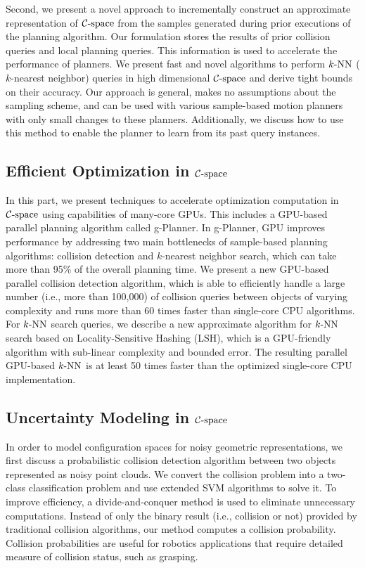 Second, we present a novel approach to incrementally construct an approximate representation of $\mathcal C\text{-space}$ from the samples generated during prior executions of the planning algorithm. Our formulation stores the results of prior collision queries and local planning queries. This information is used to accelerate the performance of planners. We present fast and novel algorithms to perform $k\text{-NN}$ ($k$-nearest neighbor) queries in high dimensional $\mathcal C\text{-space}$ and derive tight bounds on their accuracy. Our approach is general, makes no assumptions about the sampling scheme, and can be used with various sample-based motion planners with only small changes to these planners. Additionally, we discuss how to use this method to enable the planner to learn from its past query instances.

\subsection{Efficient Optimization in $\mathcal C\text{-space}$}
In this part, we present techniques to accelerate optimization computation in $\mathcal C\text{-space}$ using capabilities of many-core GPUs. This includes a GPU-based parallel planning algorithm called g-Planner. In g-Planner, GPU improves performance by addressing two main bottlenecks of sample-based planning algorithms: collision detection and $k$-nearest neighbor search, which can take more than 95\% of the overall planning time. We present a new GPU-based parallel collision detection
algorithm, which is able to efficiently handle a large number (i.e., more than 100,000) of collision queries between objects of varying complexity and runs more than 60 times faster than single-core CPU
algorithms. For $k\text{-NN}$ search queries, we describe a new approximate algorithm for $k\text{-NN}$ search based on Locality-Sensitive
Hashing (LSH), which is a GPU-friendly algorithm with sub-linear complexity and bounded error. The resulting
parallel GPU-based $k\text{-NN}$ is at least 50 times faster than the optimized single-core CPU implementation.

\subsection{Uncertainty Modeling in $\mathcal C\text{-space}$}
In order to model configuration spaces for noisy geometric representations, we first discuss a probabilistic collision detection algorithm between two objects represented as noisy point clouds. We convert the collision problem into a two-class classification problem and use extended SVM algorithms to solve it. To improve efficiency, a divide-and-conquer method is used to eliminate unnecessary computations. Instead of only the binary result (i.e., collision or not) provided by traditional collision algorithms, our method computes a collision probability. Collision probabilities are useful for robotics applications that require detailed measure of collision status, such as grasping.

